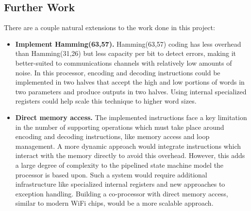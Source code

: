 \documentclass[letterpaper]{article} %
\begin{document}
\subsection{Further Work}
There are a couple natural extensions to the work done in this project:
\begin{itemize}
	\item \textbf{Implement Hamming(63,57).} Hamming(63,57) coding has less overhead than Hamming(31,26) but less capacity per bit to detect errors, making it better-suited to communications channels with relatively low amounts of noise. In this processor, encoding and decoding instructions could be implemented in two halves that accept the high and low portions of words in two parameters and produce outputs in two halves. Using internal specialized registers could help scale this technique to higher word sizes.
	\item \textbf{Direct memory access.} The implemented instructions face a key limitation in the number of supporting operations which must take place around encoding and decoding instructions, like memory access and loop management. A more dynamic approach would integrate instructions which interact with the memory directly to avoid this overhead. However, this adds a large degree of complexity to the pipelined state machine model the processor is based upon. Such a system would require additional infrastructure like specialized internal registers and new approaches to exception handling. Building a co-processor with direct memory access, similar to modern WiFi chips, would be a more scalable approach.
\end{itemize}
\end{document}
